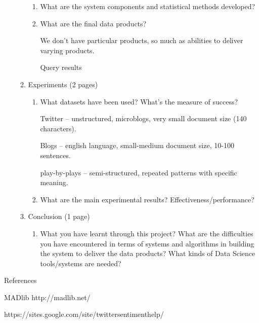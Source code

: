 \documentclass{article}
\begin{document}
\begin{enumerate}
\begin{enumerate}
\begin{enumerate}
    \item What are the system components and statistical methods developed?

    \item What are the final data products?

      We don't have particular products, so much as abilities to deliver varying products.

      Query results
    \end{enumerate}

  \item Experiments (2 pages)
    \begin{enumerate}
    \item What datasets have been used? What’s the measure of success?


      Twitter -- unstructured, microblogs, very small document size (140 characters).

      Blogs -- english language, small-medium document size, 10-100 sentences.

      play-by-plays -- semi-structured, repeated patterns with specific meaning.

    \item What are the main experimental results? Effectiveness/performance?
    \end{enumerate}

  \item Conclusion (1 page)
    \begin{enumerate}\item What you have learnt through this project?
      What are the difficulties you have encountered in terms of systems and algorithms in building the system to deliver the data products?
      What kinds of Data Science tools/systems are needed?
    \end{enumerate}
  \end{enumerate}
\end{enumerate}

References

MADlib http://madlib.net/

https://sites.google.com/site/twittersentimenthelp/
\end{document}
